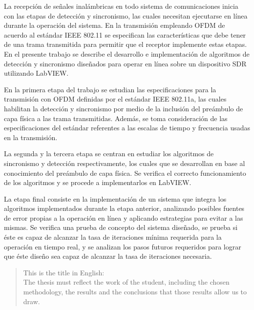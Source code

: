 \begin{resumen}%

La recepción de señales inalámbricas en todo sistema de comunicaciones inicia con las etapas de detección y sincronismo, las cuales necesitan ejecutarse en línea durante la operación del sistema. En la transmisión empleando OFDM de acuerdo al estándar IEEE 802.11 se especifican las características que debe tener de una trama transmitida para permitir que el receptor implemente estas etapas. En el presente trabajo se describe el desarrollo e implementación de algoritmos de detección y sincronismo diseñados para operar en línea sobre un dispositivo SDR utilizando LabVIEW. 

En la primera etapa del trabajo se estudian las especificaciones para la transmisión con OFDM definidas por el estándar IEEE 802.11a, las cuales habilitan la detección y sincronismo por medio de la inclusión del preámbulo de capa física a las trama transmitidas. Además, se toma consideración de las especificaciones del estándar referentes a las escalas de tiempo y frecuencia usadas en la transmisión.

La segunda y la tercera etapa se centran en estudiar los algoritmos de sincronismo y detección respectivamente, los cuales que se desarrollan en base al conocimiento del preámbulo de capa física. Se verifica el correcto funcionamiento de los algoritmos y se procede a implementarlos en LabVIEW.

La etapa final consiste en la implementación de un sistema que integra los algoritmos implementados durante la etapa anterior, analizando posibles fuentes de error propias a la operación en línea y aplicando estrategias para evitar a las mismas. Se verifica una prueba de concepto del sistema diseñado, se prueba si éste es capaz de alcanzar la tasa de iteraciones mínima requerida para la operación en tiempo real, y se analizan los pasos futuros requeridos para lograr que éste diseño sea capaz de alcanzar la tasa de iteraciones necesaria.

\end{resumen}

\begin{abstract}%
This is the title in English:\\
The thesis must reflect the work of the student, including the chosen methodology, the results and the conclusions that those results allow us to draw.
\end{abstract}


